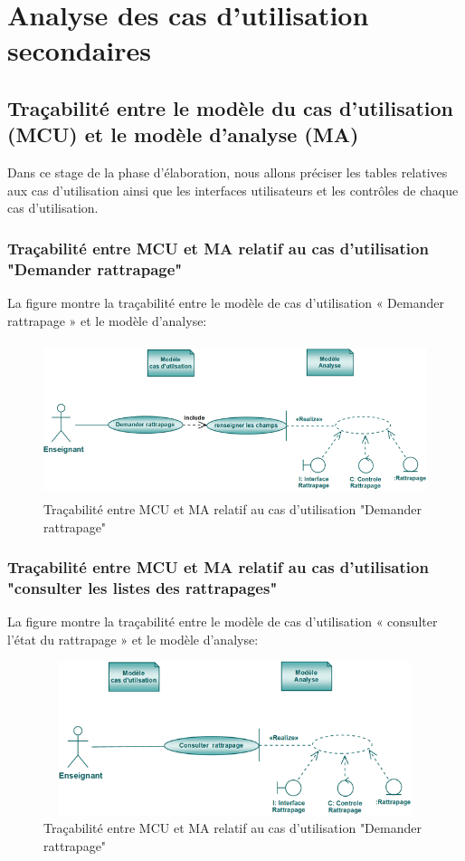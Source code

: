 \documentclass[12 pt]{report}
\begin{document}
\section{Analyse des cas d’utilisation secondaires }
\subsection{Traçabilité entre le modèle du cas d’utilisation (MCU) et le modèle d’analyse (MA)}
Dans ce stage de la phase d'élaboration, nous allons préciser les tables relatives aux cas d’utilisation ainsi que les interfaces utilisateurs et les contrôles de chaque cas d’utilisation.
\subsubsection{Traçabilité entre MCU et MA relatif au cas d’utilisation "Demander rattrapage" }
La figure  montre la traçabilité entre le modèle de cas d’utilisation « Demander rattrapage » et le modèle d’analyse:

\begin{figure}[h]
\begin{center}
\includegraphics[width= 14cm , height =4.5cm]{tdr.PNG}
\caption{Traçabilité entre MCU et MA relatif au cas d’utilisation "Demander rattrapage"}
\end{center}
\end{figure} 
\subsubsection{Traçabilité entre MCU et MA relatif au cas d’utilisation "consulter les listes des rattrapages" }
La figure  montre la traçabilité entre le modèle de cas d’utilisation « consulter l'état du rattrapage » et le modèle d’analyse:

\begin{figure}[h]
\begin{center}
\includegraphics[width= 14cm , height =4.5cm]{tcr.PNG}
\caption{Traçabilité entre MCU et MA relatif au cas d’utilisation "Demander rattrapage"}
\end{center}
\end{figure} 
\end{document}
